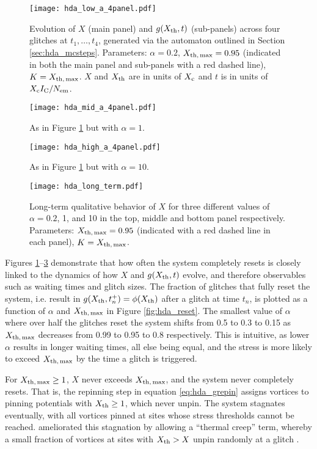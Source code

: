 \begin{figure}
\centering
\texttt{[image: hda\_low\_a\_4panel.pdf]}
\caption{Evolution of $X$ (main panel) and $g(X_{\rm th}, t)$ (sub-panels) across four glitches at $t_1, \dots, t_4$, generated via the automaton outlined in Section \ref{sec:hda_mcsteps}. Parameters: $\alpha=0.2$, $X_{\rm th,\,max}=0.95$ (indicated in both the main panel and sub-panels with a red dashed line), $K=X_{\rm th,\,max}$. $X$ and $X_{\rm th}$ are in units of $X_\textrm{c}$ and $t$ is in units of $X_\textrm{c} I_{\rm C} / N_{\rm em}$.\label{fig:hda_lowa_4}}
\end{figure}
\begin{figure}
\centering
\texttt{[image: hda\_mid\_a\_4panel.pdf]}
\caption{As in Figure \ref{fig:hda_lowa_4} but with $\alpha=1$. \label{fig:hda_mida_4}}
\end{figure}
\begin{figure}
\centering
\texttt{[image: hda\_high\_a\_4panel.pdf]}
\caption{As in Figure \ref{fig:hda_lowa_4} but with $\alpha=10$.\label{fig:hda_higha_4}}
\end{figure}

\begin{figure}
\centering
\texttt{[image: hda\_long\_term.pdf]}
\caption{Long-term qualitative behavior of $X$ for three different values of $\alpha = 0.2$, 1, and 10 in the top, middle and bottom panel respectively. Parameters: $X_{\rm th,\,max}=0.95$ (indicated with a red dashed line in each panel), $K=X_{\rm th,\,max}$. \label{fig:hda_longterm}}
\end{figure}

Figures \ref{fig:hda_lowa_4}--\ref{fig:hda_higha_4} demonstrate that how often the system completely resets is closely linked to the dynamics of how $X$ and $g(X_{\rm th}, t)$ evolve, and therefore observables such as waiting times and glitch sizes. The fraction of glitches that fully reset the system, i.e. result in $g(X_{\rm th}, t_{n}^+) = \phi(X_{\rm th})$ after a glitch at time $t_n$, is plotted as a function of $\alpha$ and $X_{\rm th,\,max}$ in Figure \ref{fig:hda_reset}. The smallest value of $\alpha$ where over half the glitches reset the system shifts from 0.5 to 0.3 to 0.15 as $X_{\rm th,\,max}$ decreases from 0.99 to 0.95 to 0.8 respectively. This is intuitive, as lower $\alpha$ results in longer waiting times, all else being equal, and the stress is more likely to exceed $X_{\rm th,\,max}$ by the time a glitch is triggered.

For $X_{\rm th,\,max} \geq 1$, $X$ never exceeds $X_{\rm th,\,max}$, and the system never completely resets. That is, the repinning step in equation \eqref{eq:hda_grepin} assigns vortices to pinning potentials with $X_{\rm th} \geq 1$, which never unpin. The system stagnates eventually, with all vortices pinned at sites whose stress thresholds cannot be reached. \citet{Melatos2009} ameliorated this stagnation by allowing a ``thermal creep'' term, whereby a small fraction of vortices at sites with $X_{\rm th} > X$ unpin randomly at a glitch \citep{Sneppen1997}. 

